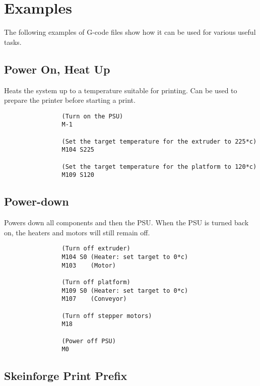 			
	
	\section{Examples}
		
		The following examples of G-code files show how it can be used for various
		useful tasks.
		
		\subsection{Power On, Heat Up}
			
			Heats the system up to a temperature suitable for printing. Can be used to
			prepare the printer before starting a print.
			
			\begin{verbatim}
				(Turn on the PSU)
				M-1
				
				(Set the target temperature for the extruder to 225*c)
				M104 S225
				
				(Set the target temperature for the platform to 120*c)
				M109 S120
			\end{verbatim}
			
		\subsection{Power-down}
			
			Powers down all components and then the PSU. When the PSU is turned back
			on, the heaters and motors will still remain off.
			
			\begin{verbatim}
				(Turn off extruder)
				M104 S0 (Heater: set target to 0*c)
				M103    (Motor)
				
				(Turn off platform)
				M109 S0 (Heater: set target to 0*c)
				M107    (Conveyor)
				
				(Turn off stepper motors)
				M18
				
				(Power off PSU)
				M0
			\end{verbatim}
		
		\subsection{Skeinforge Print Prefix}
			
